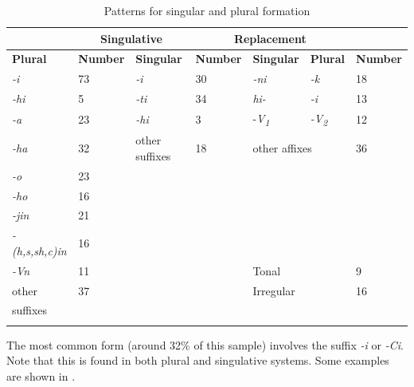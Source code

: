 \documentclass[output=paper]{langsci/langscibook}
\begin{document}
\begin{table}
\begin{tabularx}{\textwidth}{lXXXXXX}
\lsptoprule

\multicolumn{2}{c}{ \textbf{Plurative}} & \multicolumn{2}{c}{ \textbf{Singulative}} & \multicolumn{3}{c}{ \textbf{Replacement}}\\ \midrule
 \textbf{Plural} & \textbf{Number} & \textbf{Singular} & \textbf{Number} & \textbf{Singular} & \textbf{Plural} & \textbf{Number}\\ \midrule
\itshape {}-i & 73 & \itshape {}-i & 30 & \itshape {}-ni & \itshape {}-k & 18\\
\itshape {}-hi & 5 & \itshape {}-ti & 34 & \itshape hi- & \itshape {}-i & 13\\
\itshape {}-a & 23 & \itshape {}-hi & 3 & {}-\textit{V}\textit{\textsubscript{1}}\textit{  } & \itshape {}-V\textsubscript{2} & 12\\
\itshape {}-ha & 32 & other suffixes & 18 & \multicolumn{2}{l}{other affixes} & 36\\
\itshape {}-o & 23 &  &  &  &  & \\
\itshape {}-ho & 16 &  &  &  &  & \\
\itshape {}-jin & 21 &  &  &  &  & \\
\itshape {}-(h,s,sh,c)in & 16 &  &  &  &  & \\
\hhline{~~~~---}
\itshape {}-Vn & 11 &  &  & Tonal &  & 9\\
other & 37 &  &  & Irregular &  & 16\\
suffixes & & & & & & \\
\lspbottomrule
\end{tabularx}
\caption{Patterns for singular and plural formation}
\label{tab:moodie:9}
\end{table}

The most common form (around 32\% of this sample) involves the suffix \textit{-i} or \textit{-Ci}. Note that this is found in both plural and singulative systems. Some examples are shown in .  
\end{document}
